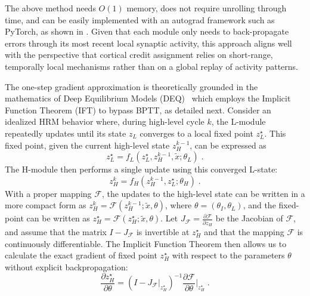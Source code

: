 The above method needs $O(1)$ memory, does not require unrolling through time, and can be easily implemented with an autograd framework such as PyTorch, as shown in . Given that each module only needs to back-propagate errors through its most recent local synaptic activity, this approach aligns well with the perspective that cortical credit assignment relies on short-range, temporally local mechanisms rather than on a global replay of activity patterns.



The one-step gradient approximation is theoretically grounded in the mathematics of Deep Equilibrium Models (DEQ)~\citep{bai2019deep} which employs the Implicit Function Theorem (IFT) to bypass BPTT, as detailed next. Consider an idealized HRM behavior where, during high-level cycle $k$, the L-module repeatedly updates until its state $z_L$ converges to a local fixed point $z_L^\star$. This fixed point, given the current high-level state $z_H^{k-1}$, can be expressed as
\begin{equation*}
    z_L^\star = f_L(z_L^\star, z_H^{k-1}, \tilde{x}; \theta_L) \;.
\end{equation*}
The H-module then performs a single update using this converged L-state:
\begin{equation*}
    z_H^k = f_H(z_H^{k-1}, z_L^\star; \theta_H) \;.
\end{equation*}
With a proper mapping $\mathcal{F}$, the updates to the high-level state can be written in a more compact form as $z_H^k = \mathcal{F}(z_H^{k-1}; \tilde{x}, \theta)$, where $\theta = (\theta_I, \theta_L)$, and the fixed-point can be written as $z_H^\star = \mathcal{F}(z_H^\star; \tilde{x}, \theta)$. Let $ J_{\mathcal{F}} = \frac{\partial \mathcal{F}}{\partial z_H}$ be the Jacobian of $\mathcal{F}$, and assume that the matrix $I - J_{\mathcal{F}}$ is invertible at $z_H^\star$ and that the mapping $\mathcal{F}$ is continuously differentiable. The Implicit Function Theorem then allows us to calculate the exact gradient of fixed point $z_H^\star$ with respect to the parameters $\theta$ without explicit backpropagation:
\begin{equation}
\label{eq:IFT-zH}
\frac{\partial z_H^\star}{\partial \theta} = \left( I - J_{\mathcal{F}} \big|_{z_H^\star} \right)^{-1} \frac{\partial \mathcal{F}}{\partial \theta} \bigg|_{z_H^\star} \;.
\end{equation}

